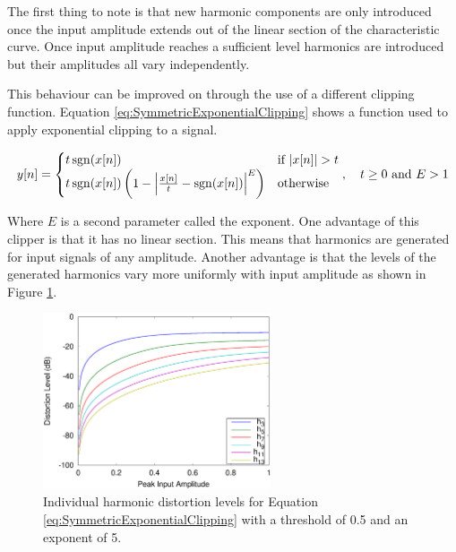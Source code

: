 			The first thing to note is that new harmonic components are only introduced once the input
			amplitude extends out of the linear section of the characteristic curve. Once input amplitude
			reaches a sufficient level harmonics are introduced but their amplitudes all vary independently.

			This behaviour can be improved on through the use of a different clipping function. Equation
			\ref{eq:SymmetricExponentialClipping} shows a function used to apply exponential clipping to a
			signal.
			
			\begin{equation}
				y[n] = \begin{cases}
					t\operatorname{sgn}(x[n]) & \text{if $|x[n]| > t$} \\
					t\operatorname{sgn}(x[n]) \left(1 - \left|\frac{x[n]}{t} - \operatorname{sgn}(x[n]) \right|^{E} \right) &
						\text{otherwise}
				\end{cases}, \quad t \geq 0 \ \text{and} \ E > 1
				\label{eq:SymmetricExponentialClipping}
			\end{equation}

			Where $E$ is a second parameter called the exponent. One advantage of this clipper is that it has
			no linear section. This means that harmonics are generated for input signals of any amplitude.
			Another advantage is that the levels of the generated harmonics vary more uniformly with input
			amplitude as shown in Figure \ref{fig:ExponentialClippingHarmonics}.

			\begin{figure}[h!]
				\centering
				\includegraphics[width=0.6\textwidth]{chapter3/Images/ExponentialClippingHarmonics.eps}
				\caption{Individual harmonic distortion levels for Equation
					 \ref{eq:SymmetricExponentialClipping} with a threshold of 0.5 and an 
				         exponent of 5.}
				\label{fig:ExponentialClippingHarmonics}
			\end{figure}

